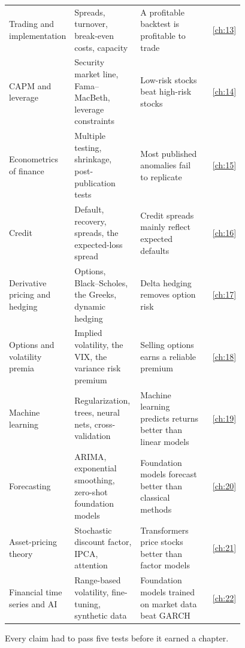 \begin{longtable}{@{}>{\raggedright\arraybackslash}p{0.198\linewidth}>{\raggedright\arraybackslash}p{0.288\linewidth}>{\raggedright\arraybackslash}p{0.297\linewidth}r@{}}
Trading and implementation & Spreads, turnover, break-even costs, capacity & A profitable backtest is profitable to trade & \ref{ch:13} \\
CAPM and leverage & Security market line, Fama--MacBeth, leverage constraints & Low-risk stocks beat high-risk stocks & \ref{ch:14} \\
Econometrics of finance & Multiple testing, shrinkage, post-publication tests & Most published anomalies fail to replicate & \ref{ch:15} \\
Credit & Default, recovery, spreads, the expected-loss spread & Credit spreads mainly reflect expected defaults & \ref{ch:16} \\
Derivative pricing and hedging & Options, Black--Scholes, the Greeks, dynamic hedging & Delta hedging removes option risk & \ref{ch:17} \\
Options and volatility premia & Implied volatility, the VIX, the variance risk premium & Selling options earns a reliable premium & \ref{ch:18} \\
Machine learning & Regularization, trees, neural nets, cross-validation & Machine learning predicts returns better than linear models & \ref{ch:19} \\
Forecasting & ARIMA, exponential smoothing, zero-shot foundation models & Foundation models forecast better than classical methods & \ref{ch:20} \\
Asset-pricing theory & Stochastic discount factor, IPCA, attention & Transformers price stocks better than factor models & \ref{ch:21} \\
Financial time series and AI & Range-based volatility, fine-tuning, synthetic data & Foundation models trained on market data beat GARCH & \ref{ch:22} \\
\end{longtable}
\endgroup

Every claim had to pass five tests before it earned a chapter.

